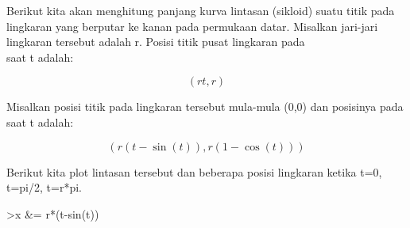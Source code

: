\documentclass[a4paper,10pt]{article}
\begin{document}
\begin{eulernotebook}
\begin{eulercomment}
\begin{eulercomment}
\begin{eulercomment}
\begin{eulercomment}
\begin{eulercomment}
\begin{eulercomment}
\begin{eulercomment}
\begin{eulercomment}
\begin{eulercomment}
\begin{eulercomment}
\begin{eulercomment}
\begin{eulercomment}
\begin{eulercomment}
\begin{eulercomment}
\begin{eulercomment}
\begin{eulercomment}
\begin{eulercomment}
\begin{eulercomment}
\begin{eulercomment}
Berikut kita akan menghitung panjang kurva lintasan (sikloid) suatu
titik pada lingkaran yang berputar ke kanan pada permukaan datar.
Misalkan jari-jari lingkaran tersebut adalah r. Posisi titik pusat
lingkaran pada\\
saat t adalah:

\end{eulercomment}
\begin{eulerformula}
\[
(rt,r)
\]
\end{eulerformula}
\begin{eulercomment}
Misalkan posisi titik pada lingkaran tersebut mula-mula (0,0) dan
posisinya pada saat t adalah:

\end{eulercomment}
\begin{eulerformula}
\[
(r(t-\sin(t)),r(1-\cos(t)))
\]
\end{eulerformula}
\begin{eulercomment}
Berikut kita plot lintasan tersebut dan beberapa posisi lingkaran
ketika t=0, t=pi/2, t=r*pi.
\end{eulercomment}
\begin{eulerprompt}
>x &= r*(t-sin(t))
\end{eulerprompt}
\begin{euleroutput}
  

\end{euleroutput}
\end{eulercomment}
\end{eulercomment}
\end{eulercomment}
\end{eulercomment}
\end{eulercomment}
\end{eulercomment}
\end{eulercomment}
\end{eulercomment}
\end{eulercomment}
\end{eulercomment}
\end{eulercomment}
\end{eulercomment}
\end{eulercomment}
\end{eulercomment}
\end{eulercomment}
\end{eulercomment}
\end{eulercomment}
\end{eulercomment}
\end{eulernotebook}
\end{document}
